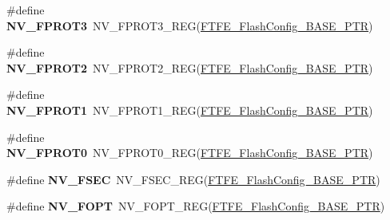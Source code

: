 \begin{DoxyCompactItemize}
\item 
\hypertarget{group___n_v___register___accessor___macros_ga04c3d23d8164e3fb7fb4f3e011869b5a}{}\#define {\bfseries N\+V\+\_\+\+F\+P\+R\+O\+T3}~N\+V\+\_\+\+F\+P\+R\+O\+T3\+\_\+\+R\+E\+G(\hyperlink{group___n_v___peripheral_ga824c84d1d5dcc180128d85f4f676b4c5}{F\+T\+F\+E\+\_\+\+Flash\+Config\+\_\+\+B\+A\+S\+E\+\_\+\+P\+T\+R})\label{group___n_v___register___accessor___macros_ga04c3d23d8164e3fb7fb4f3e011869b5a}

\item 
\hypertarget{group___n_v___register___accessor___macros_gaedf00f22b7dabfa124aeb38cdd5fb8a8}{}\#define {\bfseries N\+V\+\_\+\+F\+P\+R\+O\+T2}~N\+V\+\_\+\+F\+P\+R\+O\+T2\+\_\+\+R\+E\+G(\hyperlink{group___n_v___peripheral_ga824c84d1d5dcc180128d85f4f676b4c5}{F\+T\+F\+E\+\_\+\+Flash\+Config\+\_\+\+B\+A\+S\+E\+\_\+\+P\+T\+R})\label{group___n_v___register___accessor___macros_gaedf00f22b7dabfa124aeb38cdd5fb8a8}

\item 
\hypertarget{group___n_v___register___accessor___macros_ga35eb345943dea70476ecc9f1cc3db473}{}\#define {\bfseries N\+V\+\_\+\+F\+P\+R\+O\+T1}~N\+V\+\_\+\+F\+P\+R\+O\+T1\+\_\+\+R\+E\+G(\hyperlink{group___n_v___peripheral_ga824c84d1d5dcc180128d85f4f676b4c5}{F\+T\+F\+E\+\_\+\+Flash\+Config\+\_\+\+B\+A\+S\+E\+\_\+\+P\+T\+R})\label{group___n_v___register___accessor___macros_ga35eb345943dea70476ecc9f1cc3db473}

\item 
\hypertarget{group___n_v___register___accessor___macros_gabd1755172d62e3c49cb9e79d2065a147}{}\#define {\bfseries N\+V\+\_\+\+F\+P\+R\+O\+T0}~N\+V\+\_\+\+F\+P\+R\+O\+T0\+\_\+\+R\+E\+G(\hyperlink{group___n_v___peripheral_ga824c84d1d5dcc180128d85f4f676b4c5}{F\+T\+F\+E\+\_\+\+Flash\+Config\+\_\+\+B\+A\+S\+E\+\_\+\+P\+T\+R})\label{group___n_v___register___accessor___macros_gabd1755172d62e3c49cb9e79d2065a147}

\item 
\hypertarget{group___n_v___register___accessor___macros_ga6bdca22aa1e76ebd389ecf4a5d70b93c}{}\#define {\bfseries N\+V\+\_\+\+F\+S\+E\+C}~N\+V\+\_\+\+F\+S\+E\+C\+\_\+\+R\+E\+G(\hyperlink{group___n_v___peripheral_ga824c84d1d5dcc180128d85f4f676b4c5}{F\+T\+F\+E\+\_\+\+Flash\+Config\+\_\+\+B\+A\+S\+E\+\_\+\+P\+T\+R})\label{group___n_v___register___accessor___macros_ga6bdca22aa1e76ebd389ecf4a5d70b93c}

\item 
\hypertarget{group___n_v___register___accessor___macros_gad508c386413905d31c12a2319fa355e3}{}\#define {\bfseries N\+V\+\_\+\+F\+O\+P\+T}~N\+V\+\_\+\+F\+O\+P\+T\+\_\+\+R\+E\+G(\hyperlink{group___n_v___peripheral_ga824c84d1d5dcc180128d85f4f676b4c5}{F\+T\+F\+E\+\_\+\+Flash\+Config\+\_\+\+B\+A\+S\+E\+\_\+\+P\+T\+R})\label{group___n_v___register___accessor___macros_gad508c386413905d31c12a2319fa355e3}


\end{DoxyCompactItemize}
